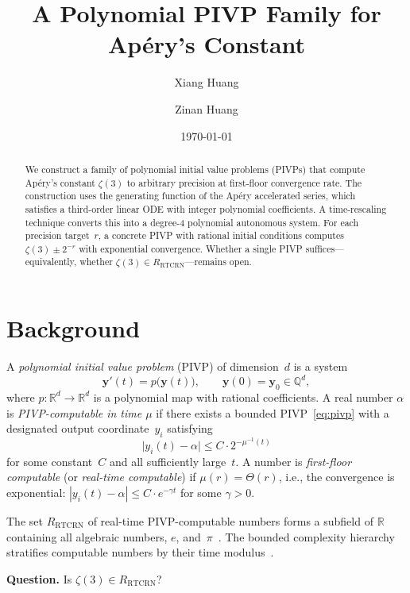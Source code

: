 \documentclass[11pt]{article}
\title{A Polynomial PIVP Family for Ap\'ery's Constant}
\author{Xiang Huang \and Zinan Huang}
\date{\today}
\newcommand{\R}{\mathbb{R}}
\newcommand{\Q}{\mathbb{Q}}
\newcommand{\RTCRN}{R_{\mathrm{RTCRN}}}
\begin{document}
\maketitle

\begin{abstract}
We construct a family of polynomial initial value problems (PIVPs) that compute
Ap\'ery's constant $\zeta(3)$ to arbitrary precision at first-floor convergence rate.
The construction uses the generating function of the Ap\'ery accelerated series,
which satisfies a third-order linear ODE with integer polynomial coefficients.
A time-rescaling technique converts this into a degree-4 polynomial autonomous system.
For each precision target~$r$, a concrete PIVP with rational initial conditions
computes $\zeta(3) \pm 2^{-r}$ with exponential convergence.
Whether a single PIVP suffices---equivalently, whether $\zeta(3) \in \RTCRN$---remains open.
\end{abstract}

\section{Background}

A \emph{polynomial initial value problem} (PIVP) of dimension~$d$ is a system
\begin{equation}\label{eq:pivp}
  \mathbf{y}'(t) = p\bigl(\mathbf{y}(t)\bigr), \qquad \mathbf{y}(0) = \mathbf{y}_0 \in \Q^d,
\end{equation}
where $p\colon \R^d \to \R^d$ is a polynomial map with rational coefficients.
A real number $\alpha$ is \emph{PIVP-computable in time $\mu$} if there exists a
bounded PIVP~\eqref{eq:pivp} with a designated output coordinate~$y_i$ satisfying
\[
  \bigl|y_i(t) - \alpha\bigr| \le C \cdot 2^{-\mu^{-1}(t)}
\]
for some constant~$C$ and all sufficiently large~$t$.
A number is \emph{first-floor computable} (or \emph{real-time computable})
if $\mu(r) = \Theta(r)$, i.e., the convergence is exponential:
$|y_i(t) - \alpha| \le C \cdot e^{-\gamma t}$ for some $\gamma > 0$.

The set $\RTCRN$ of real-time PIVP-computable numbers forms a subfield of $\R$
containing all algebraic numbers, $e$, and~$\pi$~\cite{RTCRN2}.
The bounded complexity hierarchy stratifies computable numbers by their
time modulus~\cite{BAC}.

\medskip
\noindent\textbf{Question.} Is $\zeta(3) \in \RTCRN$?
\end{document}
